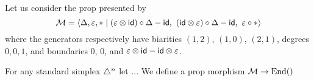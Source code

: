Let us consider the prop presented by
\[
\M = \langle \Delta, \varepsilon, \ast \mid (\varepsilon \otimes \id) \circ \Delta - \id,\  (\id \otimes \varepsilon) \circ \Delta - \id,\ \varepsilon \circ \ast \rangle
\]
where the generators respectively have biarities $(1,2)$, $(1,0)$, $(2,1)$, degrees $0,0,1$, and boundaries $0$, $0$, and $\varepsilon \otimes \mathsf{id} - \mathsf{id} \otimes \varepsilon$.

For any standard simplex $\triangle^n$ let ...
We define a prop morphism $\mathcal{M} \to \mathrm{End}()$










%
%

